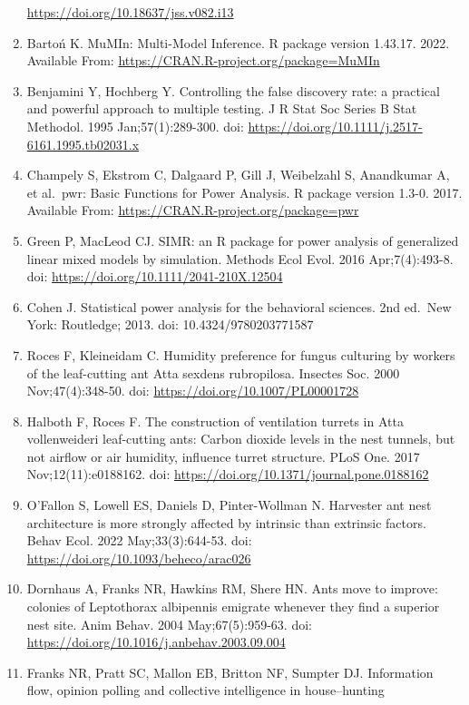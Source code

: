 \documentclass[3p]{elsarticle} %
\begin{document}
\begin{enumerate}
  \url{https://doi.org/10.18637/jss.v082.i13}
\item
  Bartoń K. MuMIn: Multi-Model Inference. R package version 1.43.17.
  2022. Available From: \url{https://CRAN.R-project.org/package=MuMIn}
\item
  Benjamini Y, Hochberg Y. Controlling the false discovery rate: a
  practical and powerful approach to multiple testing. J R Stat Soc
  Series B Stat Methodol. 1995 Jan;57(1):289-300. doi:
  \url{https://doi.org/10.1111/j.2517-6161.1995.tb02031.x}
\item
  Champely S, Ekstrom C, Dalgaard P, Gill J, Weibelzahl S, Anandkumar A,
  et al.~pwr: Basic Functions for Power Analysis. R package version
  1.3-0. 2017. Available From:
  \url{https://CRAN.R-project.org/package=pwr}
\item
  Green P, MacLeod CJ. SIMR: an R package for power analysis of
  generalized linear mixed models by simulation. Methods Ecol Evol. 2016
  Apr;7(4):493-8. doi: \url{https://doi.org/10.1111/2041-210X.12504}
\item
  Cohen J. Statistical power analysis for the behavioral sciences. 2nd
  ed.~New York: Routledge; 2013. doi: 10.4324/9780203771587
\item
  Roces F, Kleineidam C. Humidity preference for fungus culturing by
  workers of the leaf-cutting ant Atta sexdens rubropilosa. Insectes
  Soc. 2000 Nov;47(4):348-50. doi:
  \url{https://doi.org/10.1007/PL00001728}
\item
  Halboth F, Roces F. The construction of ventilation turrets in Atta
  vollenweideri leaf-cutting ants: Carbon dioxide levels in the nest
  tunnels, but not airflow or air humidity, influence turret structure.
  PLoS One. 2017 Nov;12(11):e0188162. doi:
  \url{https://doi.org/10.1371/journal.pone.0188162}
\item
  O'Fallon S, Lowell ES, Daniels D, Pinter-Wollman N. Harvester ant nest
  architecture is more strongly affected by intrinsic than extrinsic
  factors. Behav Ecol. 2022 May;33(3):644-53. doi:
  \url{https://doi.org/10.1093/beheco/arac026}
\item
  Dornhaus A, Franks NR, Hawkins RM, Shere HN. Ants move to improve:
  colonies of Leptothorax albipennis emigrate whenever they find a
  superior nest site. Anim Behav. 2004 May;67(5):959-63. doi:
  \url{https://doi.org/10.1016/j.anbehav.2003.09.004}
\item
  Franks NR, Pratt SC, Mallon EB, Britton NF, Sumpter DJ. Information
  flow, opinion polling and collective intelligence in house--hunting

\end{enumerate}
\end{document}
